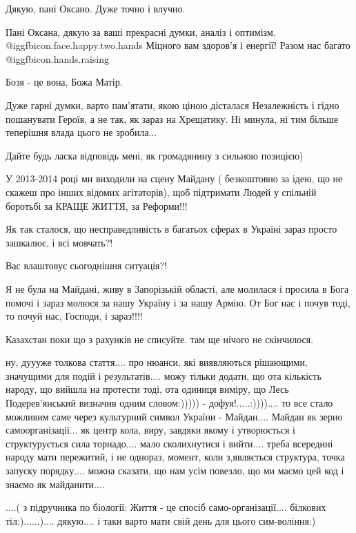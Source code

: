 \begin{itemize}
Дякую, пані Оксано. Дуже точно і влучно.

Пані Оксана, дякую за ваші прекрасні думки, аналіз і оптимізм.  @igg{fbicon.face.happy.two.hands}  Міцного вам здоров’я і енергії! Разом нас багато  @igg{fbicon.hands.raising} 

Бозя - це вона, Божа Матір.


Дуже гарні думки, варто пам'ятати, якою ціною дісталася Незалежність і гідно
пошанувати Героїв, а не так, як зараз на Хрещатику. Ні минула, ні тим більше
теперішня влада цього не зробила...


Дайте будь ласка відповідь мені, як громадянину з сильною позицією)

У 2013-2014 році ми виходили на сцену Майдану ( безкоштовно за ідею, що не
скажеш про інших відомих агітаторів), щоб підтримати Людей у спільній боротьбі
за КРАЩЕ ЖИТТЯ, за Реформи!!!

Як так сталося, що несправедливість в багатьох сферах в Україні зараз просто
зашкалює, і всі мовчать?!

Вас влаштовує сьогоднішня ситуація?!


Я не була на Майдані, живу в Запорізькій області, але молилася і просила в Бога
помочі і зараз молюся за нашу Україну і за нашу Армію. От Бог нас і почув
тоді, то почуй нас, Господи, і зараз!!!!

Казахстан поки що з рахунків не списуйте. там ще нічого не скінчилося.


ну, дуууже толкова стаття.... про нюанси, які виявляються рішающими, значущими
для подій і результатів.... можу тільки додати, що ота кількість народу, що
вийшла на протести тоді, ота одиниця виміру, що Лесь Подерев'янський визначив
одним словом:))))) - дофуя!.....:)))).... то все стало можливим саме через
культурний символ України - Майдан.... Майдан як зерно самоорганізації... як
центр кола, виру, завдяки якому і утворюється і структурується сила торнадо....
мало сколихнутися і вийти.... треба всередині народу мати пережитий, і не
однораз, момент, коли з,являється структура, точка запуску порядку.... можна
сказати, що нам усім повезло, що ми маємо цей код і знаємо як майданити....

....( з підручника по біології: Життя - це спосіб само-організації.... білкових
тіл:)......).... дякую.... і таки варто мати свій день для цього сим-воління:)


\end{itemize}
